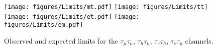 \begin{figure}[tbh!]
  \centering
  \texttt{[image: figures/Limits/mt.pdf]}
  \texttt{[image: figures/Limits/tt]}\\
  \texttt{[image: figures/Limits/et.pdf]}
  \texttt{[image: figures/Limits/em.pdf]}
  \caption{Observed and expected limits for the $\tau_{\mu}\tau_{h}$,
    $\tau_{h}\tau_{h}$, $\tau_{e}\tau_{h}$, $\tau_{e}\tau_{\mu}$
    channels.  %
    }
    \label{fig:Limits}
\end{figure}

\iffalse
\fi

